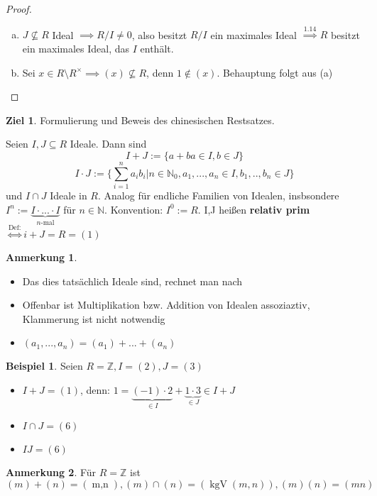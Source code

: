 \documentclass[a4paper, titlepage]{article}
\theoremstyle{definition}
\newtheorem{bsp}[satz]{Beispiel}
\newtheorem*{anm}{Anmerkung}
\newtheorem*{ziel}{Ziel}
\newcommand{\N}{\mathbb{N}}
\newcommand{\Z}{\mathbb{Z}}
\begin{document}
\begin{proof}
    \begin{enumerate}[(a)]
        \item $J\not\subseteq R$ Ideal $\implies R/I\neq 0$, also besitzt $R/I$ ein maximales Ideal $\overset{1.14}{\implies} R $ besitzt ein maximales Ideal, das $I$ enthält.
        \item Sei $x\in R\setminus R^{\times}\implies (x)\not\subseteq R$, denn $ 1\notin (x)$. Behauptung folgt aus (a)
    \end{enumerate}
\end{proof}
\begin{ziel}
    Formulierung und Beweis des chinesischen Restsatzes.
\end{ziel}
\begin{definition}
    Seien $I,J\subseteq R$ Ideale. Dann sind 
    $$I+J := \{a+b{a\in I, b\in J}\}$$
    $$I\cdot J := \{\sum_{i=1}^{n}a_ib_i|n\in \N_0, a_1,...,a_n\in I, b_1,..,b_n\in J\}$$
    und $I\cap J $ Ideale in $R$.
    Analog für endliche Familien von Idealen, insbsondere $I^n:=\underbrace{I\cdot ... \cdot I}_{n \text{-mal}}$ für $n\in \N$. Konvention: $I^0:=R$. I,J heißen \textbf{relativ prim}$\overset{\text{Def:}}\Leftrightarrow i+J =R=(1)$
\end{definition}
\begin{anm}
    \begin{itemize}
        \item Das dies tatsächlich Ideale sind, rechnet man nach
        \item Offenbar ist Multiplikation bzw. Addition von Idealen assoziaztiv, Klammerung ist nicht notwendig
        \item $(a_1,...,a_n) = (a_1)+...+(a_n)$
    \end{itemize}
\end{anm}
\begin{bsp}
    Seien $R=\Z, I=(2), J=(3)$
    \begin{itemize}
        \item $I+J=(1)$, denn: $ 1=\underbrace{(-1)\cdot 2}_{\in I}+\underbrace{1\cdot 3}_{\in J}\in I+J$
        \item $I \cap J = (6)$
        \item $IJ=(6)$
    \end{itemize}
\end{bsp}
\begin{anm}
     Für $R=\Z$ ist $(m)+(n) =(\operatorname{m,n}),(m)\cap(n)=(\operatorname{kgV}(m,n)),(m)(n)=(mn)$

\end{anm}
\end{document}
